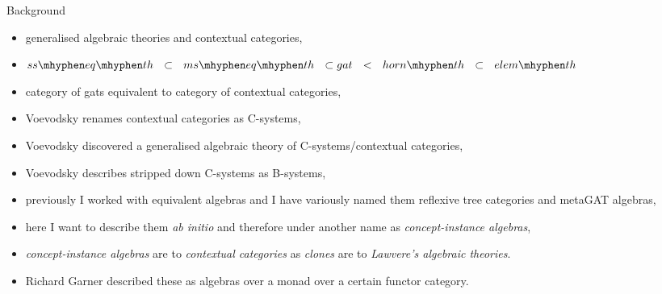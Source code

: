 \begin{frame}{Background}
\begin{itemize}
\item generalised algebraic theories and contextual categories,
\item $ss\mhyphen eq\mhyphen th \ \ \subset\ \  ms\mhyphen eq\mhyphen th \ \ \subset gat \ \ < \ \ horn\mhyphen th \ \ \subset \ \  elem\mhyphen th$
\item category of gats equivalent to category of contextual categories,
\item Voevodsky renames contextual categories as C-systems,
\item Voevodsky discovered a generalised algebraic theory of C-systems/contextual categories,
\item Voevodsky describes stripped down  C-systems as B-systems,
\item previously I worked with equivalent algebras and I have variously named them reflexive tree categories and metaGAT algebras,
\item here I want to describe them \textit{ab initio} and therefore under another name as \textit{concept-instance algebras},
\item \textit{concept-instance algebras} are to \textit{contextual categories} as \textit{clones} are to \textit{Lawvere's  algebraic theories}.
\item Richard Garner described these as algebras over a monad over a certain functor category.
\end{itemize}
\end{frame}

